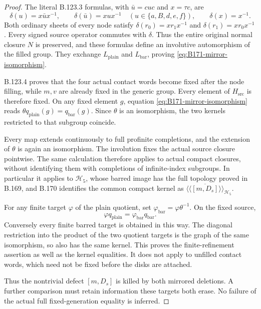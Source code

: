 \begin{proof}
The literal B.123.3 formulas, with \(\bar u=cuc\) and \(x=\tau c\), are
\[
 \delta(u)=x\bar ux^{-1},\qquad
 \delta(\bar u)=xux^{-1}
       \quad(u\in\{a,B,d,e,f\}),\qquad
 \delta(x)=x^{-1}.
\]
Both ordinary sheets of every node satisfy
\(\delta(r_0)=xr_1x^{-1}\) and
\(\delta(r_1)=xr_0x^{-1}\). Every signed source operator commutes with
\(\delta\). Thus the entire original normal closure \(N\) is preserved,
and these formulas define an involutive automorphism of the filled group.
They exchange \(L_{\mathrm{plain}}\) and \(L_{\mathrm{bar}}\), proving
\eqref{eq:B171-mirror-isomorphism}.

B.123.4 proves that the four actual contact words become fixed after
the node filling, while \(m,v\) are already fixed in the generic group.
Every element of \(H_{\mathrm{src}}\) is therefore fixed. On any fixed
element \(g\), equation \eqref{eq:B171-mirror-isomorphism} reads
\(\theta q_{\mathrm{plain}}(g)=q_{\mathrm{bar}}(g)\).
Since \(\theta\) is an isomorphism, the two kernels restricted to that
subgroup coincide.

Every map extends continuously to full profinite completions, and the
extension of \(\theta\) is again an isomorphism. The involution fixes
the actual source closure pointwise. The same calculation therefore
applies to actual compact closures, without identifying them with
completions of infinite-index subgroups. In particular it applies to
\(\mathcal H_5\), whose barred image has the full topology proved in
B.169, and B.170 identifies the common compact kernel as
\(\overline{\langle\!\langle[m,D_s]\rangle\!\rangle}_{\mathcal H_5}\).

For any finite target \(\varphi\) of the plain quotient, set
\(\varphi_{\mathrm{bar}}=\varphi\theta^{-1}\).
On the fixed source,
\[
 \varphi q_{\mathrm{plain}}
     =\varphi_{\mathrm{bar}}q_{\mathrm{bar}}.
\]
Conversely every finite barred target is obtained in this way.
The diagonal restriction into the product of the two quotient targets
is the graph of the same isomorphism, so also has the same kernel.
This proves the finite-refinement assertion as well as the kernel
equalities. It does not apply to unfilled contact words, which need
not be fixed before the disks are attached.

Thus the nontrivial defect \([m,D_s]\) is killed by both mirrored
deletions. A further comparison must retain information these targets
both erase. No failure of the actual full fixed-generation equality
is inferred.
\end{proof}

